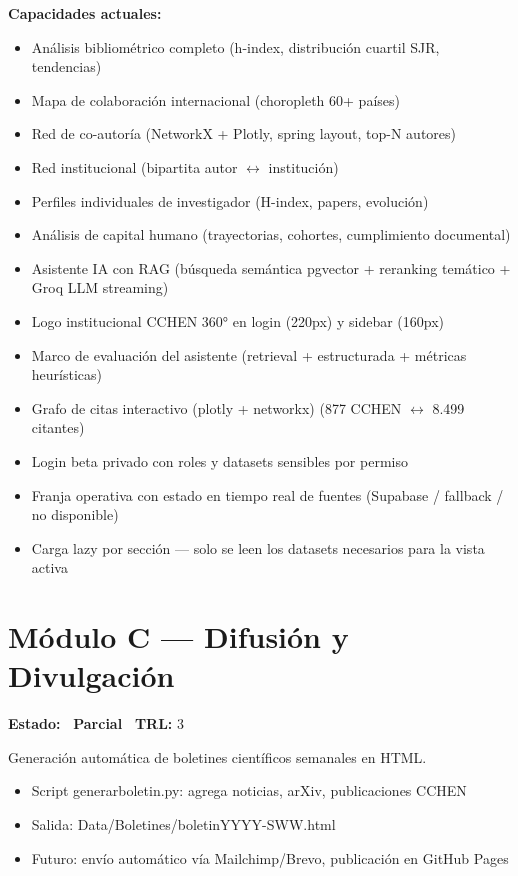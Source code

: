 \documentclass[12pt,a4paper]{report}
\newcommand{\filebreak}{\char95\allowbreak}
\newcommand{\file}[1]{{\color{cchenblue}\ttfamily\let\_\filebreak #1}}
\newcommand{\badge}[2]{%
  \colorbox{#1}{\color{white}\small\textbf{\ #2\ }}%
}
\newcommand{\bpartial}{\badge{cchengold}{Parcial}}
\begin{document}
\textbf{Capacidades actuales:}
\begin{itemize}
  \item Análisis bibliométrico completo (h-index, distribución cuartil SJR, tendencias)
  \item Mapa de colaboración internacional (choropleth 60+ países)
  \item Red de co-autoría (NetworkX + Plotly, spring layout, top-N autores)
  \item Red institucional (bipartita autor $\leftrightarrow$ institución)
  \item Perfiles individuales de investigador (H-index, papers, evolución)
  \item Análisis de capital humano (trayectorias, cohortes, cumplimiento documental)
  \item Asistente IA con RAG (búsqueda semántica pgvector + reranking temático + Groq LLM streaming)
  \item Logo institucional CCHEN 360° en login (220px) y sidebar (160px)
  \item Marco de evaluación del asistente (retrieval + estructurada + métricas heurísticas)
  \item Grafo de citas interactivo (plotly + networkx) (877 CCHEN $\leftrightarrow$ 8.499 citantes)
  \item Login beta privado con roles y datasets sensibles por permiso
  \item Franja operativa con estado en tiempo real de fuentes (Supabase / fallback / no disponible)
  \item Carga lazy por sección --- solo se leen los datasets necesarios para la vista activa
\end{itemize}

\section{Módulo C --- Difusión y Divulgación}
\textbf{Estado:} \bpartial \quad \textbf{TRL:} 3

Generación automática de boletines científicos semanales en HTML.

\begin{itemize}
  \item Script \file{generar\_boletin.py}: agrega noticias, arXiv, publicaciones CCHEN
  \item Salida: \file{Data/Boletines/boletin\_YYYY-SWW.html}
  \item Futuro: envío automático vía Mailchimp/Brevo, publicación en GitHub Pages
\end{itemize}
\end{document}
